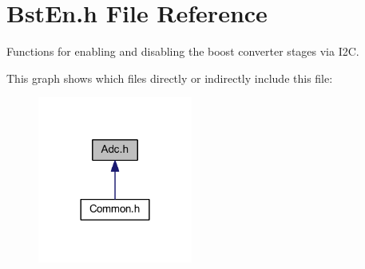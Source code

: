 \hypertarget{a00007}{\section{Bst\-En.\-h File Reference}
\label{a00007}
}


Functions for enabling and disabling the boost converter stages via I2\-C.  


This graph shows which files directly or indirectly include this file\-:\nopagebreak
\begin{figure}[H]
\begin{center}
\leavevmode
\includegraphics[width=144pt]{a00043}
\end{center}
\end{figure}
